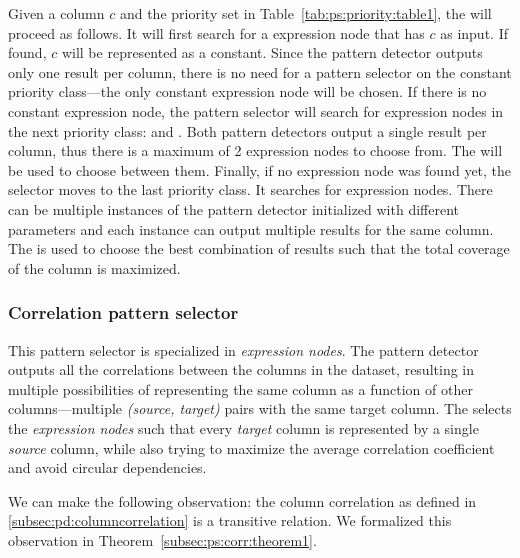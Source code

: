 

Given a column \(c\) and the priority set in Table~\ref{tab:ps:priority:table1}, the  will proceed as follows. It will first search for a  expression node that has \(c\) as input. If found, \(c\) will be represented as a constant. Since the  pattern detector outputs only one result per column, there is no need for a pattern selector on the constant priority class---the only constant expression node will be chosen. If there is no constant expression node, the pattern selector will search for expression nodes in the next priority class:  and . Both pattern detectors output a single result per column, thus there is a maximum of 2 expression nodes to choose from. The  will be used to choose between them. Finally, if no expression node was found yet, the selector moves to the last priority class. It searches for  expression nodes.
There can be multiple instances of the  pattern detector initialized with different parameters and each instance can output multiple results for the same column. The  is used to choose the best combination of results such that the total coverage of the column is maximized.

\subsubsection{Correlation pattern selector}
\label{subsubsec:ps:correlation}

This pattern selector is specialized in  \textit{expression nodes}. The  pattern detector outputs all the correlations between the columns in the dataset, resulting in multiple possibilities of representing the same column as a function of other columns---multiple \textit{(source, target)} pairs with the same target column. The  selects the \textit{expression nodes} such that every \textit{target} column is represented by a single \textit{source} column, while also trying to maximize the average correlation coefficient and avoid circular dependencies.

We can make the following observation: the column correlation as defined in \ref{subsec:pd:columncorrelation} is a transitive relation. We formalized this observation in Theorem~\ref{subsec:ps:corr:theorem1}.

